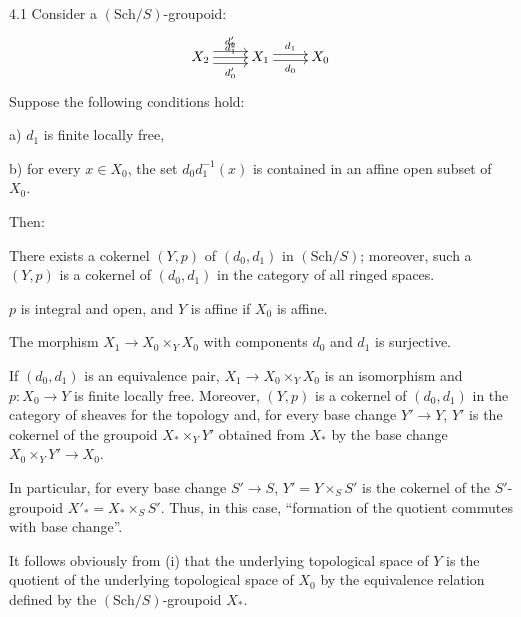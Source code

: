 \begin{theorem}{4.1}\label{V.4.1}
Consider a $(\mathrm{Sch}/S)$-groupoid:
\[
\xymatrix{X_2\ar@<1ex>[r]^{d'_2}\ar[r]^{d'_1}\ar@<-1ex>[r]_{d'_0}&X_1\ar@<.5ex>[r]^{d_1}\ar@<-.5ex>[r]_{d_0}&X_0}
\]
Suppose the following conditions hold:

\textup{a)} $d_1$ is finite locally free,

\textup{b)} for every $x\in X_0$, the set $d_0d_1^{-1}(x)$ is contained in an affine open subset of $X_0$.

Then:
\begin{enumeratei}
\item There exists a cokernel $(Y,p)$ of $(d_0,d_1)$ in $(\mathrm{Sch}/S)$; moreover, such a $(Y,p)$ is a cokernel of $(d_0,d_1)$ in the category of all ringed spaces.
\item $p$ is integral and open, and $Y$ is affine if $X_0$ is affine.
\item The morphism $X_1\to X_0\times_YX_0$ with components $d_0$ and $d_1$ is surjective.
\item If $(d_0,d_1)$ is an equivalence pair, $X_1\to X_0\times_YX_0$ is an isomorphism and $p:X_0\to Y$ is finite locally free. Moreover, $(Y,p)$ is a cokernel of $(d_0,d_1)$ in the category of sheaves for the \fppf topology and, for every base change $Y'\to Y$, $Y'$ is the cokernel of the groupoid $X_*\times_YY'$ obtained from $X_*$ by the base change $X_0\times_YY'\to X_0$.
\end{enumeratei}
In particular, for every base change $S'\to S$, $Y'=Y\times_SS'$ is the cokernel of the $S'$-groupoid $X'_*=X_*\times_SS'$. Thus, in this case, ``formation of the quotient commutes with base change''.
\end{theorem}
It follows obviously from (i) that the underlying topological space of $Y$ is the quotient of the underlying topological space of $X_0$ by the equivalence relation defined by the $(\mathrm{Sch}/S)$-groupoid $X_*$.

